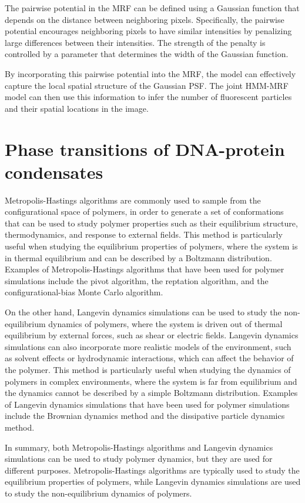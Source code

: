 \documentclass{ucetd}
\begin{document}
The pairwise potential in the MRF can be defined using a Gaussian function that depends on the distance between neighboring pixels. Specifically, the pairwise potential encourages neighboring pixels to have similar intensities by penalizing large differences between their intensities. The strength of the penalty is controlled by a parameter that determines the width of the Gaussian function.

By incorporating this pairwise potential into the MRF, the model can effectively capture the local spatial structure of the Gaussian PSF. The joint HMM-MRF model can then use this information to infer the number of fluorescent particles and their spatial locations in the image.


\chapter{Phase transitions of DNA-protein condensates}

Metropolis-Hastings algorithms are commonly used to sample from the configurational space of polymers, in order to generate a set of conformations that can be used to study polymer properties such as their equilibrium structure, thermodynamics, and response to external fields. This method is particularly useful when studying the equilibrium properties of polymers, where the system is in thermal equilibrium and can be described by a Boltzmann distribution. Examples of Metropolis-Hastings algorithms that have been used for polymer simulations include the pivot algorithm, the reptation algorithm, and the configurational-bias Monte Carlo algorithm.

On the other hand, Langevin dynamics simulations can be used to study the non-equilibrium dynamics of polymers, where the system is driven out of thermal equilibrium by external forces, such as shear or electric fields. Langevin dynamics simulations can also incorporate more realistic models of the environment, such as solvent effects or hydrodynamic interactions, which can affect the behavior of the polymer. This method is particularly useful when studying the dynamics of polymers in complex environments, where the system is far from equilibrium and the dynamics cannot be described by a simple Boltzmann distribution. Examples of Langevin dynamics simulations that have been used for polymer simulations include the Brownian dynamics method and the dissipative particle dynamics method.

In summary, both Metropolis-Hastings algorithms and Langevin dynamics simulations can be used to study polymer dynamics, but they are used for different purposes. Metropolis-Hastings algorithms are typically used to study the equilibrium properties of polymers, while Langevin dynamics simulations are used to study the non-equilibrium dynamics of polymers.
\end{document}
